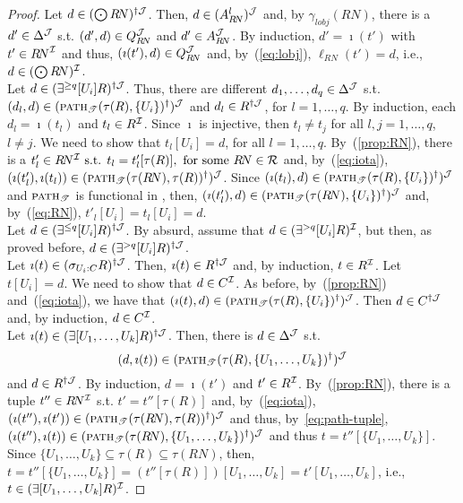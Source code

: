 \documentclass[envcountsame,draft]{llncs}
\newcommand{\lreif}[1]{\ensuremath{\bigodot#1}}
\newcommand{\pth}[2]{\ensuremath{\textsc{path}_{\mathscr{T}}(#1,#2)}\xspace}
\begin{document}
\begin{proof}
  Let $d\in(\lreif R\!N)^{\dag\Jmc}$. Then, $d\in (A_{R\!N}^l)^\mathcal{J}$
  and, by $\gamma_{\textit{lobj}}({R\!N})$, there is a
  $d'\in\Delta^\mathcal{J}$ s.t. $(d',d)\in Q_{R\!N}^\mathcal{J}$ and
  $d'\in A_{R\!N}^\mathcal{J}$. By induction, $d'=\imath(t')$ with
  $t'\in {R\!N}^\mathcal{I}$ and thus, $(\imath(t'),d)\in Q_{R\!N}^\mathcal{J}$ and,
  by~(\ref{eq:lobj}), $\ell_{R\!N}(t') = d$, i.e., $d\in(\lreif R\!N)^\Imc$.
  \\
%
  Let $d\in(\exists^{\geq q}[{U_i}] R)^{\dag \mathcal{J}}$.
  Thus, there are different $d_1,\ldots,d_q\in\Delta^\mathcal{J}$ s.t.
  $(d_l,d)\in (\pth{\tau(R)}{\{U_i\}}^\dag)^{\Jmc}$ and
  $d_l\in R^{\dag \mathcal{J}}$, for $l=1,\ldots,q$. By induction, each
  $d_l=\imath(t_l)$ and $t_l\in R^\mathcal{I}$. Since $\imath$ is injective,
  then $t_l\neq t_j$ for all $l,j=1,\ldots,q$, $l\neq j$. We need to
  show that $t_l[U_i] = d$, for all
  $l=1,\ldots,q$. By~(\ref{prop:RN}), there is a
  $t'_l\in R\!N^\mathcal{I} \text{ s.t. } t_l=t'_l[\tau(R)], \text{ for some
  } R\!N\in\mathcal R$ and, by~(\ref{eq:iota}),
  $(\imath(t'_l),\imath(t_l))\in
  (\pth{\tau(R\!N)}{\tau(R)}^\dag)^\Jmc$.
  Since $(\imath(t_l) ,d) \in (\pth{\tau(R)}{\{U_i\}}^\dag)^\Jmc$ and
  $\textsc{path}_{\mathscr{T}}$ is functional in \DLRpm,
  then, $(\imath(t'_l) ,d) \in (\pth{\tau(R\!N)}{\{U_i\}}^\dag)^\Jmc$
  and, by~(\ref{eq:RN}), $t'_l[U_i]=t_l[U_i] =d$.\\
%
  Let $d\in(\exists^{\leq q}[{U_i}] R)^{\dag \mathcal{J}}$. By absurd, assume
  that $d\in(\exists^{>q}[{U_i}] R)^{\mathcal{I}}$, but then, as proved
  before, $d\in(\exists^{> q}[{U_i}] R)^{\dag \mathcal{J}}$.
\\
%
  Let $\imath(t)\in(\sigma_{U_i : C} R)^{\dag\mathcal{J}}$. Then,
  $\imath(t)\in R^{\dag \mathcal{J}}$ and, by induction, $t\in R^\mathcal{I}$. Let
  $t[U_i]=d$. We need to show that $d\in C^\mathcal{I}$. As before,
  by~(\ref{prop:RN}) and~(\ref{eq:iota}), we have that
  $(\imath(t),d)\in (\pth{\tau(R)}{\{U_i\}}^\dag)^\Jmc$. Then
  $d\in C ^{\dag\mathcal{J}}$ and, by induction, $d\in C ^{\mathcal{I}}$.\\
%
  Let $\imath(t)\in(\exists[U_1,\ldots,U_k] R)^{\dag\mathcal{J}}$. Then, there is
  $d\in\Delta^\mathcal{J}$ s.t.
  \begin{equation}
    \label{eq:path-tuple}
     (d,\imath(t)) \in (\pth{\tau(R)}{\{U_1,\ldots,U_k\}}^\dag)^\Jmc
  \end{equation}
  and $d\in R^{\dag\mathcal{J}}$.  By induction, $d=\imath(t')$ and
  $t'\in R^\mathcal{I}$. By~(\ref{prop:RN}), there is a tuple
  $t''\in R\!N^\mathcal{I}$ s.t. $t' = t''[\tau(R)]$ and, by~(\ref{eq:iota}),
  $(\imath(t''),\imath(t'))\in (\pth{\tau(R\!N)}{\tau(R)}^\dag)^\Jmc$
  and thus, by~\eqref{eq:path-tuple},
  $(\imath(t''),\imath(t))\in
  (\pth{\tau(R\!N)}{\{U_1,\ldots,U_k\}}^\dag)^\Jmc$ and thus
  $t = t''[\{U_1,\ldots,U_k\}]$. Since
  $\{U_1,\ldots,U_k\}\subseteq \tau(R) \subseteq \tau( R\!N)$, then,
  $t = t''[\{U_1,\ldots,U_k\}] = (t''[\tau(R)])[U_1,\ldots,U_k] = t'[U_1,\ldots,U_k]$, i.e.,
  $t\in(\exists[U_1,\ldots,U_k] R)^{\mathcal{I}}$.
%


\end{proof}
\end{document}
